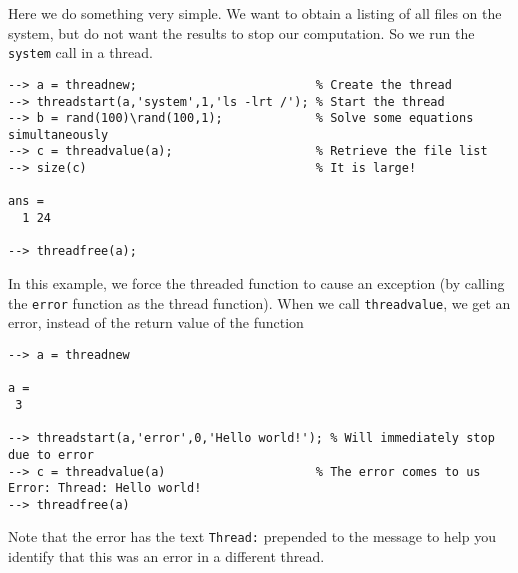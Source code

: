 Here we do something very simple.  We want to obtain a listing of
all files on the system, but do not want the results to stop our
computation.  So we run the \verb|system| call in a thread.
\begin{verbatim}
--> a = threadnew;                         % Create the thread
--> threadstart(a,'system',1,'ls -lrt /'); % Start the thread
--> b = rand(100)\rand(100,1);             % Solve some equations simultaneously
--> c = threadvalue(a);                    % Retrieve the file list
--> size(c)                                % It is large!

ans = 
  1 24 

--> threadfree(a);
\end{verbatim}
In this example, we force the threaded function to cause an
exception (by calling the \verb|error| function as the thread 
function).  When we call \verb|threadvalue|, we get an error, instead
of the return value of the function
\begin{verbatim}
--> a = threadnew

a = 
 3 

--> threadstart(a,'error',0,'Hello world!'); % Will immediately stop due to error
--> c = threadvalue(a)                     % The error comes to us
Error: Thread: Hello world!
--> threadfree(a)
\end{verbatim}
Note that the error has the text \verb|Thread:| prepended to the message
to help you identify that this was an error in a different thread.
